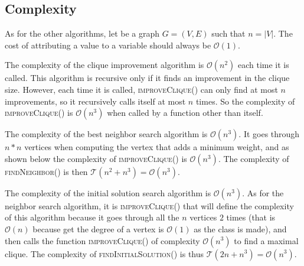 
\subsection{Complexity}

As for the other algorithms, let be a graph $G=(V,E)$ such that $n=|V|$. The cost 
of attributing a value to a variable should always be $\mathcal{O}(1)$.
\bigskip

The complexity of the clique improvement algorithm is $\mathcal{O}(n^2)$ each time it is called. 
This algorithm is recursive only if it finds an improvement in the clique size. However, each 
time it is called, \textsc{improveClique()} can only find at most $n$ improvements, so it 
recursively calls itself at most $n$ times. So the complexity of \textsc{improveClique()} is 
$\mathcal{O}(n^3)$ when called by a function other than itself.
\bigskip

The complexity of the best neighbor search algorithm is $\mathcal{O}(n^3)$. It goes through 
$n*n$ vertices when computing the vertex that adds a minimum weight, and as shown below the 
complexity of \textsc{improveClique()} is $\mathcal{O}(n^3)$. The complexity of 
\textsc{findNeighbor()} is then $\mathcal{T}(n^2 + n^3) = \mathcal{O}(n^3)$.
\bigskip

The complexity of the initial solution search algorithm is $\mathcal{O}(n^3)$. As for the 
neighbor search algorithm, it is \textsc{improveClique()} that will define the complexity of 
this algorithm because it goes through all the $n$ vertices $2$ times (that is $\mathcal{O}(n)$ 
because get the degree of a vertex is $\mathcal{O}(1)$ as the class is made), and then calls 
the function \textsc{improveClique()} of complexity $\mathcal{O}(n^3)$ to find a maximal clique. 
The complexity of \textsc{findInitialSolution()} is thus $\mathcal{T}(2n + n^3) = \mathcal{O}(n^3)$.
\bigskip

